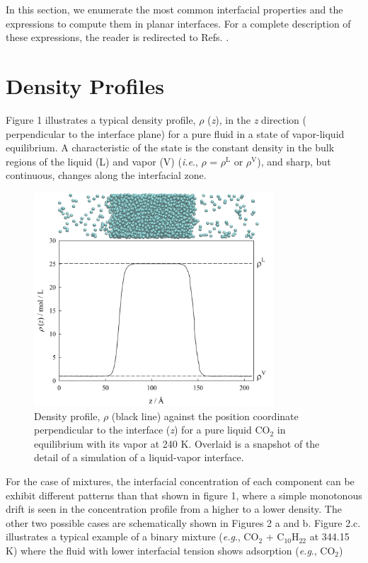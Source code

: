 \documentclass{scrbook}
\begin{document}
In this section, we enumerate the most common interfacial properties and the
expressions to compute them in planar interfaces. For a complete description of
these expressions, the reader is redirected to Refs. \citep{allen2017,gray2011}.

\section{Density Profiles}

Figure 1 illustrates a typical density profile, ${\rho}$ (\textit{z}), in the
\textit{z} direction ( perpendicular to the interface plane) for a pure fluid
in a state of vapor-liquid equilibrium. A characteristic of the state is the
constant density in the bulk regions of the liquid (L) and vapor (V)
(\textit{i.e}., ${\rho}$ = ${\rho}$$^{\mathrm{L}}$ or ${\rho}$$^{\mathrm{V}}$),
and  sharp, but continuous, changes along the interfacial zone. 

\begin{figure}
	\centering
  \includegraphics[width=0.8\textwidth]{gfx/image1.png}
  \caption{Density profile, ${\rho}$ (black line) against the position coordinate perpendicular to the interface (\textit{z}) for a pure liquid CO$_{2}$ in equilibrium with its vapor at 240 K. Overlaid is a snapshot of the detail of a simulation of a liquid-vapor interface.}
  \label{fig:1}
\end{figure}

For the case of mixtures, the interfacial concentration of each component can
be exhibit different patterns than that shown in figure 1, where a simple
monotonous drift is seen in the concentration profile from a higher to a lower
density. The other two possible cases are schematically shown in Figures
2 a and b. Figure 2.c. illustrates a typical example of a binary mixture
(\textit{e.g}., CO$_{2}$ + C$_{10}$H$_{22}$ at 344.15 K) where the fluid with
lower interfacial tension shows adsorption (\textit{e.g}., CO$_{2}$)
\end{document}
